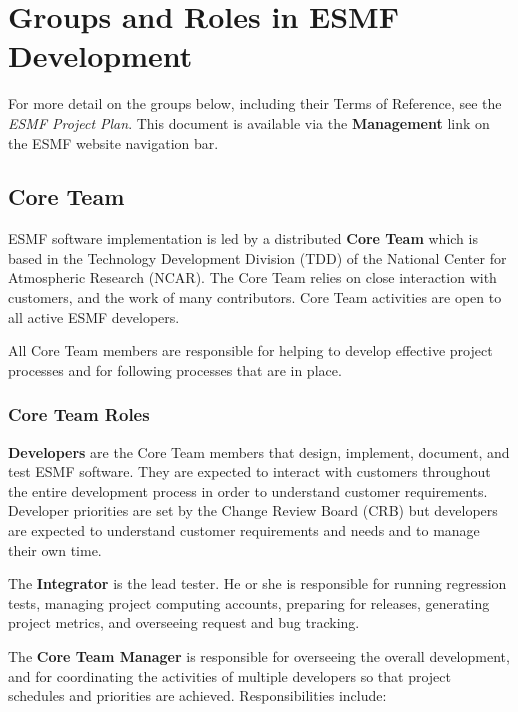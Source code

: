
\section{Groups and Roles in ESMF Development}

For more detail on the groups below, including their Terms of
Reference, see the {\it ESMF Project Plan}\cite{bib:ESMFprojectplan}.
This document is available via the {\bf Management} link on 
the ESMF website navigation bar.

\subsection{Core Team}
ESMF software implementation is led by a distributed {\bf Core Team} which is based in the 
Technology Development Division (TDD) of the National Center for
Atmospheric Research (NCAR).  The Core Team relies on close interaction
with customers, and the work of many contributors.  Core Team
activities are open to all active ESMF developers.

All Core Team members are responsible for helping to 
develop effective project processes and for following
processes that are in place.

\subsubsection{Core Team Roles}
\label{core}
{\bf Developers} are the Core Team members that design, implement, document, and test
ESMF software.  They are expected to interact with customers throughout the entire
development process in order to understand customer requirements.  Developer priorities are set by the Change Review Board (CRB) but developers are expected to understand customer requirements and
needs and to manage their own time.

The {\bf Integrator} is the lead tester. He or she is responsible for running regression
tests, managing project computing accounts, preparing for releases,
generating project metrics, and overseeing request and bug tracking.

The {\bf Core Team Manager} is responsible for overseeing the overall development, and 
for coordinating the activities of multiple developers
so that project schedules and priorities are achieved.
Responsibilities include:

